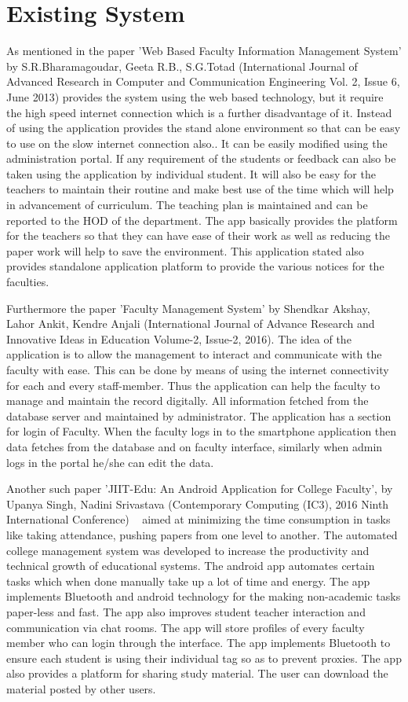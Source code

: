 \documentclass[BTech]{srmuthesis}
\begin{document}
\section{Existing System}
As mentioned in the paper 'Web Based Faculty Information Management System' by
S.R.Bharamagoudar, Geeta R.B., S.G.Totad (International Journal of Advanced Research in
Computer and Communication Engineering Vol. 2, Issue 6, June 2013) provides the system
using the web based technology, but it require the high speed internet connection which is a
further disadvantage of it. Instead of using the application provides the stand alone
environment so that can be easy to use on the slow internet connection also.. It can be easily
modified using the administration portal. If any requirement of the students or feedback can
also be taken using the application by individual student. It will also be easy for the teachers to
maintain their routine and make best use of the time which will help in advancement of
curriculum. The teaching plan is maintained and can be reported to the HOD of the
department. The app basically provides the platform for the teachers so that they can have
ease of their work as well as reducing the paper work will help to save the environment. This
application stated also provides standalone application platform to provide the various notices for the faculties.

Furthermore the paper 'Faculty Management System' by Shendkar Akshay, Lahor Ankit,
Kendre Anjali (International Journal of Advance Research and Innovative Ideas in
Education Volume-2, Issue-2, 2016). The idea of the application is to allow the management
to interact and communicate with the faculty with ease. This can be done by means of using the internet connectivity for each and every staff-member. Thus the application can help the
faculty to manage and maintain the record digitally. All information fetched from the database server and maintained by administrator. The application has a section for login of Faculty. When the faculty logs in to the smartphone application then data fetches from the database and on faculty interface, similarly when admin logs in the portal he/she can edit the data.

Another such paper 'JIIT-Edu: An Android Application for College Faculty', by Upanya Singh,
Nadini Srivastava (Contemporary Computing (IC3), 2016 Ninth International Conference)  
aimed at minimizing the time consumption in tasks like taking attendance, pushing papers from
one level to another. The automated college management system was developed to increase
the productivity and technical growth of educational systems. The android app automates
certain tasks which when done manually take up a lot of time and energy. The app implements
Bluetooth and android technology for the making non-academic tasks paper-less and fast. The
app also improves student teacher interaction and communication via chat rooms. The app will
store profiles of every faculty member who can login through the interface. The app
implements Bluetooth to ensure each student is using their individual tag so as to prevent
proxies. The app also provides a platform for sharing study material. The user can download the material posted by other users.
\end{document}
